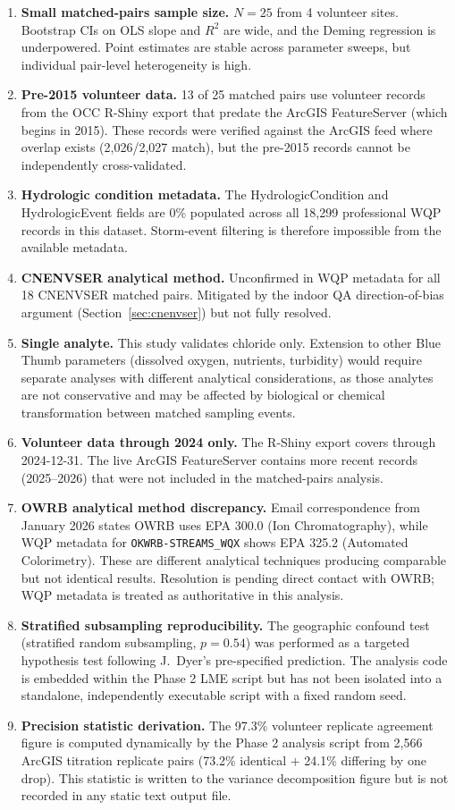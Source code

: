 \documentclass[lineno]{wlpeerj}
\begin{document}
\begin{enumerate}
  \item \textbf{Small matched-pairs sample size.} $N=25$ from 4 volunteer sites. Bootstrap CIs on OLS slope and $R^{2}$ are wide, and the Deming regression is underpowered. Point estimates are stable across parameter sweeps, but individual pair-level heterogeneity is high.
  \item \textbf{Pre-2015 volunteer data.} 13 of 25 matched pairs use volunteer records from the OCC R-Shiny export that predate the ArcGIS FeatureServer (which begins in 2015). These records were verified against the ArcGIS feed where overlap exists (2,026/2,027 match), but the pre-2015 records cannot be independently cross-validated.
  \item \textbf{Hydrologic condition metadata.} The HydrologicCondition and HydrologicEvent fields are 0\% populated across all 18,299 professional WQP records in this dataset. Storm-event filtering is therefore impossible from the available metadata.
  \item \textbf{CNENVSER analytical method.} Unconfirmed in WQP metadata for all 18 CNENVSER matched pairs. Mitigated by the indoor QA direction-of-bias argument (Section~\ref{sec:cnenvser}) but not fully resolved.
  \item \textbf{Single analyte.} This study validates chloride only. Extension to other Blue Thumb parameters (dissolved oxygen, nutrients, turbidity) would require separate analyses with different analytical considerations, as those analytes are not conservative and may be affected by biological or chemical transformation between matched sampling events.
  \item \textbf{Volunteer data through 2024 only.} The R-Shiny export covers through 2024-12-31. The live ArcGIS FeatureServer contains more recent records (2025--2026) that were not included in the matched-pairs analysis.
  \item \textbf{OWRB analytical method discrepancy.} Email correspondence from January 2026 states OWRB uses EPA 300.0 (Ion Chromatography), while WQP metadata for \texttt{OKWRB-STREAMS\_WQX} shows EPA 325.2 (Automated Colorimetry). These are different analytical techniques producing comparable but not identical results. Resolution is pending direct contact with OWRB; WQP metadata is treated as authoritative in this analysis.
  \item \textbf{Stratified subsampling reproducibility.} The geographic confound test (stratified random subsampling, $p=0.54$) was performed as a targeted hypothesis test following J.\ Dyer's pre-specified prediction. The analysis code is embedded within the Phase 2 LME script but has not been isolated into a standalone, independently executable script with a fixed random seed.
  \item \textbf{Precision statistic derivation.} The 97.3\% volunteer replicate agreement figure is computed dynamically by the Phase 2 analysis script from 2,566 ArcGIS titration replicate pairs (73.2\% identical $+$ 24.1\% differing by one drop). This statistic is written to the variance decomposition figure but is not recorded in any static text output file.
\end{enumerate}
\end{document}
